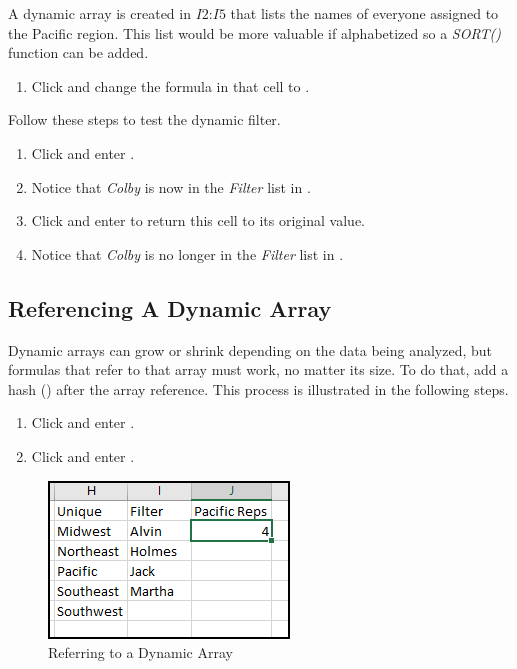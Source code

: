 A dynamic array is created in $ I2 $:$ I5 $ that lists the names of everyone assigned to the Pacific region. This list would be more valuable if alphabetized so a \textit{SORT()} function can be added. 

\begin{enumbox}
	\begin{enumerate}
		\item Click  and change the formula in that cell to . 
	\end{enumerate}
\end{enumbox}

Follow these steps to test the dynamic filter.

\begin{enumbox}
	\begin{enumerate}
		\item Click  and enter .
		\item Notice that \textit{Colby} is now in the \textit{Filter} list in .
		\item Click  and enter  to return this cell to its original value.
		\item Notice that \textit{Colby} is no longer in the \textit{Filter} list in .
	\end{enumerate}
\end{enumbox}

\subsection{Referencing A Dynamic Array}

Dynamic arrays can grow or shrink depending on the data being analyzed, but formulas that refer to that array must work, no matter its size. To do that, add a hash (\fmtKeystroke{\#}) after the array reference. This process is illustrated in the following steps.

\begin{enumbox}
	\begin{enumerate}
		\item Click  and enter .
		\item Click  and enter .
	\end{enumerate}
\end{enumbox}

\begin{figure}[H]
	\centering
	\includegraphics[width=\maxwidth{.50\linewidth}]{gfx/apb_fig04}
	\caption{Referring to a Dynamic Array}
	\label{apb:fig04}
\end{figure}

